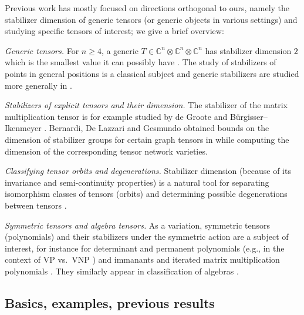 \documentclass[11pt,a4paper]{article}
\numberwithin{equation}{section}
\newcommand{\CC}{\mathbb{C}}
\begin{document}
%
%

%

%

%

%
%

%
%
%
%

%
%
Previous work has mostly focused on directions orthogonal to ours, namely the stabilizer dimension of generic tensors (or generic objects in various settings) and studying specific tensors of interest; we give a brief overview:

\emph{Generic tensors.}
%
For $n\geq4$, a generic $T \in \CC^n \otimes \CC^n \otimes \CC^n$ has stabilizer dimension $2$ which is the smallest value it can possibly have \cite{MR912058, burgisser2015fundamentalinvariantsorbitclosures, bryan2018locallymaximallyentangledstates}. 
%
The study of stabilizers of points in general positions is a classical subject \cite{MR267040, MR304554} and generic stabilizers are studied more generally in \cite{garibaldi2019genericallyfreerepresentationsi, derksen2020maximumlikelihoodestimationtensor}. 

\emph{Stabilizers of explicit tensors and their dimension.}
The stabilizer of the matrix multiplication tensor is for example studied by de Groote and B\"{u}rgisser--Ikenmeyer \cite{MR506377, burgisser2015fundamentalinvariantsorbitclosures}.
%
Bernardi, De Lazzari and Gesmundo obtained bounds on the dimension of stabilizer groups for certain graph tensors in \cite{MR4645236} while computing the dimension of the corresponding tensor network varieties.

\emph{Classifying tensor orbits and degenerations.} Stabilizer dimension (because of its invariance and semi-continuity properties) is a natural tool for separating isomorphism classes of tensors (orbits) and determining possible degenerations between tensors \cite{Burgisser1997Degen-6409, MR1781073, MR1773770, MR2865915,  MR4644081}. 

\emph{Symmetric tensors and algebra tensors.}
As a variation, symmetric tensors (polynomials) and their stabilizers under the symmetric action are a subject of interest, for instance for determinant and permanent polynomials (e.g., in the context of VP vs.~VNP \cite{MR2861717}) and immanants \cite{ye2011stabilizerimmanants}
and iterated matrix multiplication polynomials \cite{MR3513064}. 
They similarly appear in classification of algebras
\cite{MR524979}.
%
%
%
%
%
%
%
%



\subsection{Basics, examples, previous results}
\end{document}
